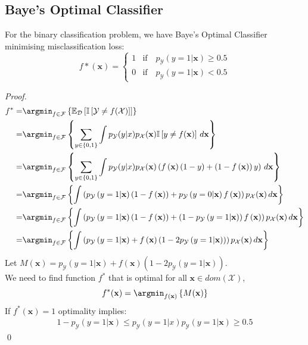 \subsection{Baye's Optimal Classifier}
For the binary classification problem, we have Baye's Optimal Classifier
minimising misclassification loss: 
\[f*(\mathbf{x})=
\begin{cases}
  1&\text{if}\quad p_\mathcal{Y}(y=1|\mathbf{x})\ge 0.5\\
  0&\text{if}\quad p_\mathcal{Y}(y=1|\mathbf{x})< 0.5
\end{cases}\] 
\begin{proof}
  \begin{align*}
    f^{*}=&\argmin_{f \in \mathcal{F}}\left\{ \mathbb{E}_\mathcal{D}\left[ \mathbb{I}\left[ \mathcal{Y}\neq f(\mathcal{X}) \right] \right] \right\}\\
         =&\argmin_{f \in \mathcal{F}}\left\{ \sum_{y\in \left\{ 0,1 \right\}} \int p_\mathcal{Y}(y|x)p_\mathcal{X}(\mathbf{x})\mathbb{I}\left[ y\neq f(\mathbf{x}) \right] \,d\mathbf{x} \right\}\\
         =&\argmin_{f \in \mathcal{F}}\left\{ \sum_{y\in \left\{ 0,1 \right\}} \int p_\mathcal{Y}(y|x)p_\mathcal{X}(\mathbf{x})\left( f\left(\mathbf{x}\right) \left(1-y\right) +\left(1-f\left(\mathbf{x}\right)\right)y\right)  \,d\mathbf{x} \right\}\\
         =&\argmin_{f \in \mathcal{F}}\left\{ \int \left( p_\mathcal{Y}\left( y=1|\mathbf{x} \right) \left(1-f\left(\mathbf{x}\right)\right) +p_\mathcal{Y}\left( y=0|\mathbf{x} \right) f\left( \mathbf{x} \right)  \right) p_\mathcal{X}(\mathbf{x})\,d\mathbf{x}  \right\}\\
         =&\argmin_{f \in \mathcal{F}}\left\{ \int \left( p_\mathcal{Y}\left( y=1|\mathbf{x} \right) \left(1-f\left(\mathbf{x}\right)\right) +\left( 1-p_\mathcal{Y}\left( y=1|\mathbf{x} \right) \right)  f\left( \mathbf{x} \right)  \right) p_\mathcal{X}(\mathbf{x}) \,d\mathbf{x}  \right\}\\
         =&\argmin_{f \in \mathcal{F}}\left\{ \int \left( p_\mathcal{Y}\left( y=1|\mathbf{x} \right) +f\left( \mathbf{x} \right) \left( 1-2p_\mathcal{Y}\left( y=1|\mathbf{x} \right) \right) \right) p_\mathcal{X}(\mathbf{x}) \,d\mathbf{x}  \right\}
  \end{align*}
  Let $M(\mathbf{x})=p_\mathcal{Y}\left( y=1|\mathbf{x} \right) +f\left( \mathbf{x} \right) \left( 1-2p_\mathcal{Y}\left( y=1|\mathbf{x} \right) \right)$.\\
  We need to find function $f^{*}$ that is optimal for all $\mathbf{x}\in dom(\mathcal{X})$, 
  \[f^{*}(\mathbf{x})=\argmin_{f(\mathbf{x})}\left\{ M(\mathbf{x}) \right\}\]
  If $f^{*}(\mathbf{x})=1$ optimality implies:
  \begin{align*}
    1-p_\mathcal{Y}\left( y=1|\mathbf{x} \right) \le p_\mathcal{Y}\left( y=1|x \right) 
    p_\mathcal{Y}\left( y=1|\mathbf{x} \right) \ge 0.5
  \end{align*}\qed%
\end{proof}
